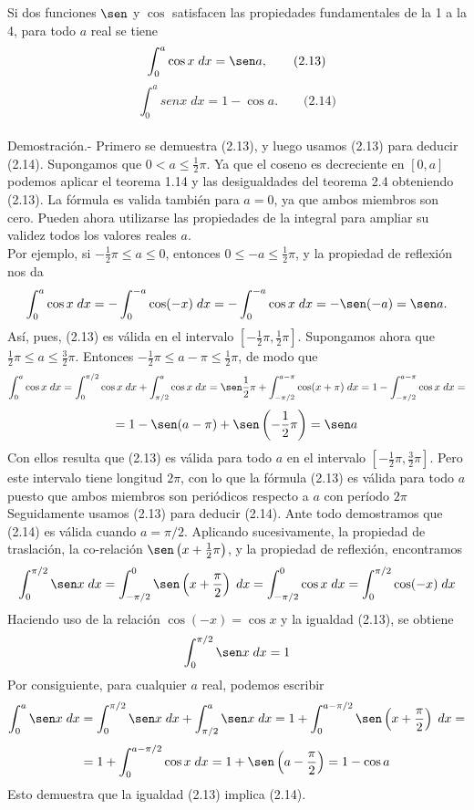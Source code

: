 \begin{teo} Si dos funciones $\sen$ y $\cos$ satisfacen las propiedades fundamentales de la 1 a la 4, para todo $a$ real se tiene $$\int_0^a \cos x\; dx = \sen a, \qquad \mbox{(2.13)}$$ $$\int_0^a sen x\; dx = 1-\cos a. \qquad \mbox{(2.14)}$$\\
    Demostración.-\; Primero se demuestra (2.13), y luego usamos (2.13) para deducir (2.14). Supongamos que $0<a\leq \frac{1}{2}\pi$. Ya que el coseno es decreciente en $[0,a]$ podemos aplicar el teorema 1.14 y las desigualdades del teorema 2.4 obteniendo (2.13). La fórmula es valida también para $a=0$, ya que ambos miembros son cero. Pueden ahora  utilizarse las propiedades de la integral para ampliar su validez todos los valores reales $a$.\\
    Por ejemplo, si $-\frac{1}{2}\pi \leq a \leq 0$, entonces $0\leq -a\leq \frac{1}{2}\pi$, y la propiedad de reflexión nos da $$\int_0^a \cos x\; dx = -\int_0^{-a} \cos (-x) \; dx = - \int_0^{-a} \cos x \; dx = -\sen (-a) = \sen a.$$
    Así, pues, (2.13) es válida en el intervalo $\left[-\frac{1}{2}\pi,\frac{1}{2}\pi\right]$. Supongamos ahora que $\frac{1}{2}\pi \leq a \leq \frac{3}{2}\pi$. Entonces $-\frac{1}{2}\pi\leq a-\pi\leq \frac{1}{2}\pi$, de modo que $$\int_0^a \cos x \; dx = \int_{0}^{\pi/2} \cos x \; dx + \int_{\pi/2}^a \cos x \; dx = \sen\frac{1}{2}\pi + \int_{-\pi/2}^{a-\pi} \cos(x+\pi)\; dx = 1-\int_{-\pi/2}^{a-\pi} \cos x \; dx = $$ $$=1 - \sen(a-\pi) + \sen\left(-\frac{1}{2}\pi\right) = \sen a$$
    Con ellos resulta que (2.13) es válida para todo $a$ en el intervalo $\left[-\frac{1}{2}\pi,\frac{3}{2}\pi\right]$. Pero este intervalo tiene longitud $2\pi$, con lo que la fórmula (2.13) es válida para todo $a$ puesto que ambos miembros son periódicos respecto a $a$ con período $2\pi$\\
    Seguidamente usamos (2.13) para deducir (2.14). Ante todo demostramos que (2.14) es válida cuando $a=\pi/2$. Aplicando sucesivamente, la propiedad de traslación, la co-relación $\sen\left(x+\frac{1}{2}\pi\right)$, y la propiedad de reflexión, encontramos 
    $$\int_0^{\pi/2}\sen x\; dx = \int_{-\pi/2}^0 \sen \left(x+\dfrac{\pi}{2}\right)\; dx = \int_{-\pi/2}^0 \cos x \; dx = \int_0^{\pi/2}\cos (-x) \; dx$$
    Haciendo uso de la relación $\cos(-x)=\cos x$ y la igualdad (2.13), se obtiene $$\int_0^{\pi/2}\sen x\; dx = 1$$
    Por consiguiente, para cualquier $a$ real, podemos escribir $$\int_0^a \sen x\;dx = \int_0^{\pi/2} \sen x\; dx + \int_{\pi/2}^a \sen x \; dx = 1 + \int_0^{a-\pi/2}\sen \left(x+\dfrac{\pi}{2}\right)\; dx =$$ $$= 1+\int_0^{a-\pi/2} \cos x \; dx = 1+\sen\left(a-\dfrac{\pi}{2}\right) = 1-\cos a$$
    Esto demuestra que la igualdad (2.13) implica (2.14).\\\\
\end{teo}

